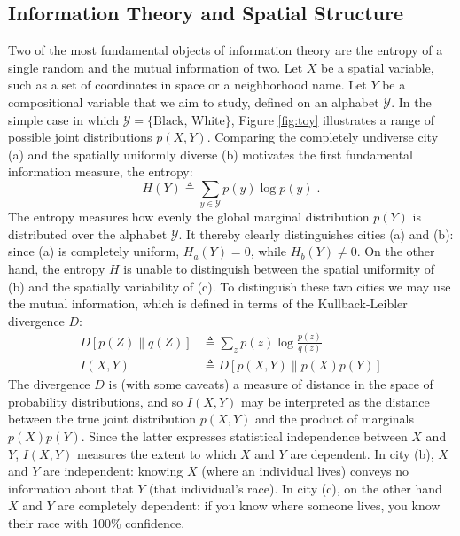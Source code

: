 \subsection{Information Theory and Spatial Structure}
	Two of the most fundamental objects of information theory are the entropy of a single random and the mutual information of two. Let $X$ be a spatial variable, such as a set of coordinates in space or a neighborhood name. Let $Y$ be a compositional variable that we aim to study, defined on an alphabet $\mathcal{Y}$. In the simple case in which $\mathcal{Y}  = \{\text{Black, White}\}$, Figure \ref{fig:toy} illustrates a range of possible joint distributions $p(X,Y)$. Comparing the completely undiverse city (a) and the spatially uniformly diverse (b) motivates the first fundamental information measure, the entropy:
	\begin{equation}
		H(Y) \triangleq \sum_{y \in \mathcal{Y}} p(y) \log p(y)\;.
	\end{equation}
	The entropy measures how evenly the global marginal distribution $p(Y)$ is distributed over the alphabet $\mathcal{Y}$. It thereby clearly distinguishes cities (a) and (b): since (a) is completely uniform, $H_a(Y) = 0$, while $H_b(Y) \neq 0$. On the other hand, the entropy $H$ is unable to distinguish between the spatial uniformity of (b) and the spatially variability of (c). To distinguish these two cities we may use the mutual information, which is defined in terms of the Kullback-Leibler divergence $D$:
	\begin{align}
		D[p(Z)\|q(Z)] &\triangleq \sum_z p(z) \log \frac{p(z)}{q(z)} \\
		I(X,Y) &\triangleq D[p(X,Y) \| p(X)p(Y)]
	\end{align}
	The divergence $D$ is (with some caveats) a measure of distance in the space of probability distributions, and so $I(X,Y)$ may be interpreted as the distance between the true joint distribution $p(X,Y)$ and the product of marginals $p(X)p(Y)$. Since the latter expresses statistical independence between $X$ and $Y$, $I(X,Y)$ measures the extent to which $X$ and $Y$ are dependent. In city (b), $X$ and $Y$ are independent: knowing $X$ (where an individual lives) conveys no information about that $Y$ (that individual's race).  In city (c), on the other hand $X$ and $Y$ are completely dependent: if you know where someone lives, you know their race with 100\% confidence. 

